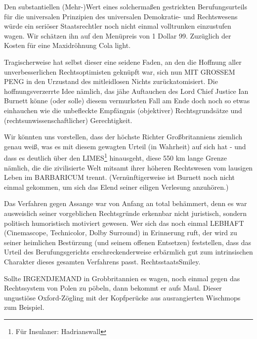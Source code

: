 \begin{multicols}{2}
Den substantiellen (Mehr-)Wert eines solchermaßen gestrickten Berufungsurteils für die universalen Prinzipien
des universalen Demokratie- und Rechtswesens würde
ein seriöser Staatsrechtler noch nicht einmal volltrunken einzustufen wagen. Wir schätzen ihn auf den Menüpreis von 1 Dollar 99. Zuzüglich der Kosten für eine
Maxidröhnung Cola light.

Tragischerweise hat selbst dieser eine seidene Faden,
an den die Hoffnung aller unverbesserlichen Rechtsoptimisten geknüpft war, sich nun MIT GROSSEM PENG
in den Urzustand des mitleidlosen Nichts zurückatomisiert. Die hoffnungsverzerrte Idee nämlich, das jähe Auftauchen des Lord Chief Justice Ian Burnett könne (oder
solle) diesem vermurksten Fall am Ende doch noch so
etwas einhauchen wie die unbefleckte Empfängnis (objektiver) Rechtsgrundsätze und (rechtsunwissenschaftlicher) Gerechtigkeit.

Wir könnten uns vorstellen, dass der höchste Richter
Großbritanniens ziemlich genau weiß, was es mit diesem gewagten Urteil (in Wahrheit) auf sich hat - und
dass es deutlich über den LIMES\footnote[33]{Für Insulaner: Hadrianswall} hinausgeht, diese 550
km lange Grenze nämlich, die die zivilisierte Welt mitsamt ihrer höheren Rechtswesen vom lausigen Leben
im BARBARICUM trennt. (Vernünftigerweise ist Burnett
noch nicht einmal gekommen, um sich das Elend seiner
eiligen Verlesung anzuhören.)

Das Verfahren gegen Assange war von Anfang an total
behämmert, denn es war ausweislich seiner vorgeblichen Rechtsgründe erkennbar nicht juristisch, sondern
politisch humoristisch motiviert gewesen. Wer sich das
noch einmal LEBHAFT (Cinemascope, Technicolor,
Dolby Surround) in Erinnerung ruft, der wird zu seiner
heimlichen Bestürzung (und seinem offenen Entsetzen) feststellen, dass das Urteil des Berufungsgerichts
erschreckenderweise erbärmlich gut zum intrinsischen
Charakter dieses gesamten Verfahrens passt. RechtsstaatsSmiley.

Sollte IRGENDJEMAND in Grobbritannien es wagen,
noch einmal gegen das Rechtssystem von Polen zu pöbeln, dann bekommt er aufs Maul. Dieser ungustiöse
Oxford-Zögling mit der Kopfperücke aus ausrangierten
Wischmops zum Beispiel.


\end{multicols}
